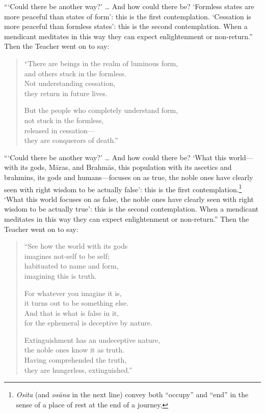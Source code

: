 \documentclass[12pt,openany]{book}%
\begin{document}
“‘Could there be another way?’ … And how could there be? ‘Formless states are more peaceful than states of form’: this is the first contemplation. ‘Cessation is more peaceful than formless states’: this is the second contemplation. When a mendicant meditates in this way they can expect enlightenment or non-return.” Then the Teacher went on to say: 

\begin{verse}%
“There are beings in the realm of luminous form, \\
and others stuck in the formless. \\
Not understanding cessation, \\
they return in future lives. 

But the people who completely understand form, \\
not stuck in the formless, \\
released in cessation—\\
they are conquerors of death.” 

%
\end{verse}

“‘Could there be another way?’ … And how could there be? ‘What this world—with its gods, \textsanskrit{Māras}, and \textsanskrit{Brahmās}, this population with its ascetics and brahmins, its gods and humans—focuses on as true, the noble ones have clearly seen with right wisdom to be actually false’: this is the first contemplation.\footnote{\textit{Osita} (and \textit{\textsanskrit{osāna}} in the next line) convey both “occupy” and “end” in the sense of a place of rest at the end of a journey. } ‘What this world focuses on as false, the noble ones have clearly seen with right wisdom to be actually true’: this is the second contemplation. When a mendicant meditates in this way they can expect enlightenment or non-return.” Then the Teacher went on to say: 

\begin{verse}%
“See how the world with its gods \\
imagines not-self to be self; \\
habituated to name and form, \\
imagining this is truth. 

For whatever you imagine it is, \\
it turns out to be something else. \\
And that is what is false in it, \\
for the ephemeral is deceptive by nature. 

Extinguishment has an undeceptive nature, \\
the noble ones know it as truth. \\
Having comprehended the truth, \\
they are hungerless, extinguished.” 

%
\end{verse}
\end{document}
